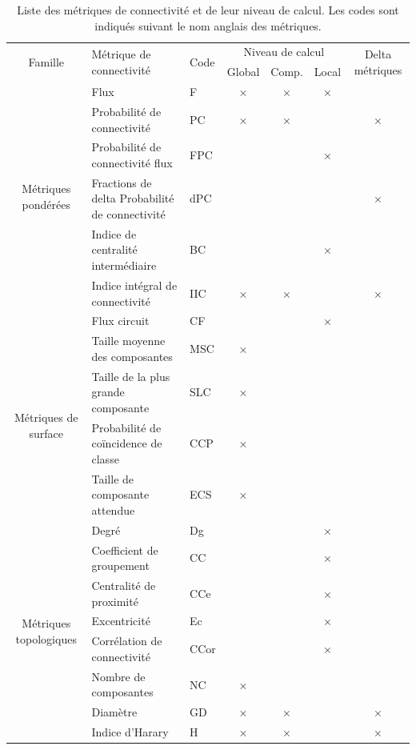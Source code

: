 \documentclass{article}
\begin{document}
\begin{table}[H]

\begin{tabular}{|c|p{7cm}|l|c|c|c|c|}
\hline
\multirow{2}{*}{Famille} & \multirow{2}{*}{Métrique de connectivité} & \multirow{2}{*}{Code} & \multicolumn{3}{m{3cm}|}{\centering Niveau de calcul} & \multirow{2}{1.5cm}{Delta métriques}\\
\hhline{~~~---~}
 &  &  & Global & Comp. & Local & \\
\hline
\multirow{6}{2cm}{Métriques pondérées}
 & Flux & F & × & × & × & \\
 & Probabilité de connectivité & PC & × & × &  & ×\\
 & Probabilité de connectivité flux & FPC &  &  & × & \\
 & Fractions de delta Probabilité de connectivité & dPC &  &  &  & ×\\
 & Indice de centralité intermédiaire & BC &  &  & × & \\
 & Indice intégral de connectivité & IIC & × & × &  & ×\\
 & Flux circuit & CF &  &  & × & \\ 
\hline
\multirow{4}{2cm}{Métriques de surface}
 & Taille moyenne des composantes & MSC & × &  &  & \\
 & Taille de la plus grande composante & SLC & × &  &  & \\
 & Probabilité de coïncidence de classe & CCP & × &  &  & \\
 & Taille de composante attendue & ECS & × &  &  & \\
\hline
\multirow{9}{2cm}{Métriques topologiques}
 & Degré & Dg &  &  & × & \\
 & Coefficient de groupement & CC &  &  & × & \\
 & Centralité de proximité & CCe &  &  & × & \\
 & Excentricité & Ec &  &  & × & \\
 & Corrélation de connectivité & CCor &  &  & × & \\
 & Nombre de composantes & NC & × &  &  & \\
 & Diamètre & GD & × & × &  & ×\\
 & Indice d’Harary & H & × & × &  & ×\\
\hline
\end{tabular}
\caption{Liste des métriques de connectivité et de leur niveau de calcul. Les codes sont indiqués suivant le nom anglais des métriques.}
\label{metric_level}
\end{table}
\end{document}
